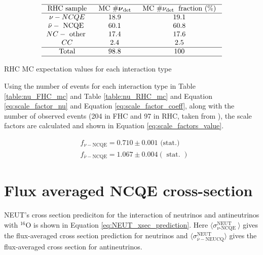 \begin{table}
    $$
    \begin{array}{ccc}
    \hline \text { RHC sample } & \text { MC } \# \boldsymbol{\nu}_{\text {det }} & \text { MC } \# \nu_{\text {det }} \text { fraction (\%) } \\
    \hline \nu-N C Q E & 18.9 & 19.1 \\
    \bar{\nu}-\text { NCQE } & 60.1 & 60.8 \\
    N C-\text { other } & 17.4 & 17.6 \\
    C C & 2.4 & 2.5 \\
    \hline \text { Total } & 98.8 & 100 \\
    \hline
    \end{array}
    $$
    \caption{RHC MC expectation values for each interaction type}
    \label{table:nu_RHC_mc}
\end{table}

Using the number of events for each interaction type in Table \ref{table:nu_FHC_mc} and Table \ref{table:nu_RHC_mc} and Equation \ref{eq:scale_factor_nu} and Equation \ref{eq:scale_factor_coeff}, along with the number of observed events (204 in FHC and 97 in RHC, taken from \cite{Abe_2019}), the scale factors are calculated and shown in Equation \ref{eq:scale_factors_value}.

\begin{equation}
    \begin{aligned}
    & f_{\nu-\mathrm{NCQE}}=0.710 \pm 0.001 \text { (stat.) } \\
    & f_{\bar{\nu}-\mathrm{NCQE}}=1.067 \pm 0.004 (\text { stat. })
    \end{aligned}
\label{eq:scale_factors_value}
\end{equation}
    


\section{Flux averaged NCQE cross-section}

NEUT's cross section prediciton for the interaction of neutrinos and antineutrinos with ${ }^{16} \mathrm{O}$ is shown in Equation \ref{eq:NEUT_xsec_prediction}. Here $\langle\sigma_{\nu \text {-NCQE }}^{\text {NEUT }}\rangle$ gives the flux-averaged cross section prediction for neutrinos and $\langle\sigma_{\bar{\nu}-\mathrm{NEUCQ}}^{\mathrm{NEUT}}\rangle$ gives the flux-averaged cross section for antineutrinos. 


